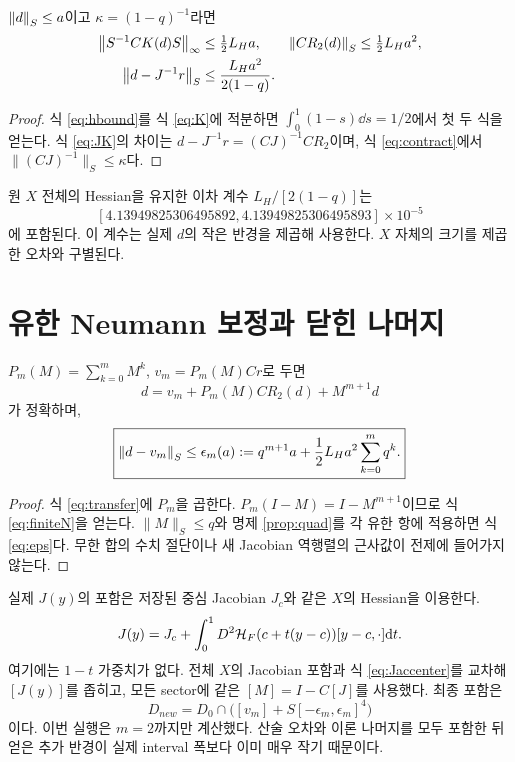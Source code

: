 \begin{proposition}[Endpoint 이차 오차]\label{prop:quad}
$\left\lVert d\right\rVert_S\le a$이고 $\kappa=(1-q)^{-1}$라면
\begin{align}
\left\lVert S^{-1}CK(d)S\right\rVert_\infty&\le\tfrac12L_Ha,&
\left\lVert CR_2(d)\right\rVert_S&\le\tfrac12L_Ha^2,\\
\left\lVert d-J^{-1}r\right\rVert_S&\le\frac{L_Ha^2}{2(1-q)}.
\label{eq:quadbound}
\end{align}
\end{proposition}
\begin{proof}
식 \eqref{eq:hbound}를 식 \eqref{eq:K}에 적분하면 $\int_0^1(1-s)\dd s=1/2$에서 첫 두 식을 얻는다. 식 \eqref{eq:JK}의 차이는 $d-J^{-1}r=(CJ)^{-1}CR_2$이며, 식 \eqref{eq:contract}에서 $\|(CJ)^{-1}\|_S\le\kappa$다.
\end{proof}

원 $X$ 전체의 Hessian을 유지한 이차 계수 $L_H/[2(1-q)]$는
\[
[4.13949825306495892,4.13949825306495893]\times10^{-5}
\]
에 포함된다.
이 계수는 실제 $d$의 작은 반경을 제곱해 사용한다. $X$ 자체의 크기를 제곱한 오차와 구별된다.

\section{유한 Neumann 보정과 닫힌 나머지}\label{sec:neumann}
\begin{theorem}[유한 endpoint 전달]\label{thm:neumann}
$P_m(M)=\sum_{k=0}^mM^k$, $v_m=P_m(M)Cr$로 두면
\begin{equation}
d=v_m+P_m(M)CR_2(d)+M^{m+1}d
\label{eq:finiteN}
\end{equation}
가 정확하며,
\begin{equation}
\boxed{\left\lVert d-v_m\right\rVert_S\le\epsilon_m(a):=
q^{m+1}a+\frac12L_Ha^2\sum_{k=0}^mq^k.}
\label{eq:eps}
\end{equation}
\end{theorem}
\begin{proof}
식 \eqref{eq:transfer}에 $P_m$을 곱한다. $P_m(I-M)=I-M^{m+1}$이므로 식 \eqref{eq:finiteN}을 얻는다. $\|M\|_S\le q$와 명제 \ref{prop:quad}를 각 유한 항에 적용하면 식 \eqref{eq:eps}다. 무한 합의 수치 절단이나 새 Jacobian 역행렬의 근사값이 전제에 들어가지 않는다.
\end{proof}

실제 $J(y)$의 포함은 저장된 중심 Jacobian $J_c$와 같은 $X$의 Hessian을 이용한다.
\begin{equation}
J(y)=J_c+\int_0^1D^2\mathcal H_F(c+t(y-c))[y-c,\cdot]\mathrm d t.
\label{eq:Jaccenter}
\end{equation}
여기에는 $1-t$ 가중치가 없다. 전체 $X$의 Jacobian 포함과 식 \eqref{eq:Jaccenter}를 교차해 $[J(y)]$를 좁히고, 모든 sector에 같은 $[M]=I-C[J]$를 사용했다. 최종 포함은
\begin{equation}
D_{new}=D_0\cap\bigl([v_m]+S[-\epsilon_m,\epsilon_m]^4\bigr)
\label{eq:intersection}
\end{equation}
이다. 이번 실행은 $m=2$까지만 계산했다. 산술 오차와 이론 나머지를 모두 포함한 뒤 얻은 추가 반경이 실제 interval 폭보다 이미 매우 작기 때문이다.

